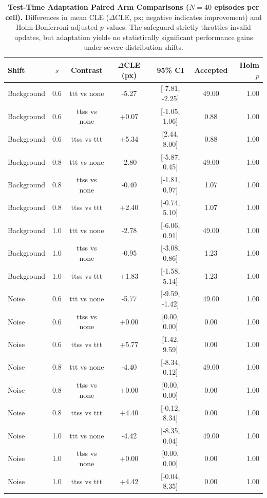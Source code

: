 \begin{table}[t]
\centering
\small
\caption{\textbf{Test-Time Adaptation Paired Arm Comparisons ($N = 40$ episodes per cell).} Differences in mean CLE ($\Delta$CLE, px; negative indicates improvement) and Holm-Bonferroni adjusted $p$-values. The safeguard strictly throttles invalid updates, but adaptation yields no statistically significant performance gains under severe distribution shifts.}
\label{tab:tta_paired_results}
\begin{tabular}{lcccccr}
\toprule
\textbf{Shift} & \textbf{$s$} & \textbf{Contrast} & \textbf{$\Delta$CLE (px)} & \textbf{95\% CI} & \textbf{Accepted} & \textbf{Holm $p$} \\
\midrule
Background & 0.6 & ttt vs none & -5.27 & [-7.81, -2.25] & 49.00 & 1.00 \\
Background & 0.6 & ttss vs none & +0.07 & [-1.05, 1.06] & 0.88 & 1.00 \\
Background & 0.6 & ttss vs ttt & +5.34 & [2.44, 8.00] & 0.88 & 1.00 \\
Background & 0.8 & ttt vs none & -2.80 & [-5.87, 0.45] & 49.00 & 1.00 \\
Background & 0.8 & ttss vs none & -0.40 & [-1.81, 0.97] & 1.07 & 1.00 \\
Background & 0.8 & ttss vs ttt & +2.40 & [-0.74, 5.10] & 1.07 & 1.00 \\
Background & 1.0 & ttt vs none & -2.78 & [-6.06, 0.91] & 49.00 & 1.00 \\
Background & 1.0 & ttss vs none & -0.95 & [-3.08, 0.86] & 1.23 & 1.00 \\
Background & 1.0 & ttss vs ttt & +1.83 & [-1.58, 5.14] & 1.23 & 1.00 \\
Noise & 0.6 & ttt vs none & -5.77 & [-9.59, -1.42] & 49.00 & 1.00 \\
Noise & 0.6 & ttss vs none & +0.00 & [0.00, 0.00] & 0.00 & 1.00 \\
Noise & 0.6 & ttss vs ttt & +5.77 & [1.42, 9.59] & 0.00 & 1.00 \\
Noise & 0.8 & ttt vs none & -4.40 & [-8.34, 0.12] & 49.00 & 1.00 \\
Noise & 0.8 & ttss vs none & +0.00 & [0.00, 0.00] & 0.00 & 1.00 \\
Noise & 0.8 & ttss vs ttt & +4.40 & [-0.12, 8.34] & 0.00 & 1.00 \\
Noise & 1.0 & ttt vs none & -4.42 & [-8.35, 0.04] & 49.00 & 1.00 \\
Noise & 1.0 & ttss vs none & +0.00 & [0.00, 0.00] & 0.00 & 1.00 \\
Noise & 1.0 & ttss vs ttt & +4.42 & [-0.04, 8.35] & 0.00 & 1.00 \\
\bottomrule
\end{tabular}
\end{table}
